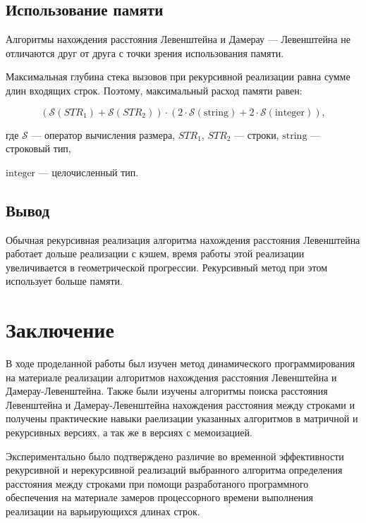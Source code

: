 \documentclass[12pt]{report}
\begin{document}
\section{Использование памяти}

Алгоритмы нахождения расстояния Левенштейна и Дамерау — Левенштейна не отличаются друг от друга с точки зрения использования памяти.

Максимальная глубина стека вызовов при рекурсивной реализации равна сумме длин входящих строк. Поэтому, максимальный расход памяти равен: 

\begin{equation}
(\mathcal{S}(STR_1) + \mathcal{S}(STR_2)) \cdot (2 \cdot \mathcal{S}\mathrm{(string)} + 2 \cdot \mathcal{S}\mathrm{(integer)}),
\end{equation}

\noindent где $\mathcal{S}$ — оператор вычисления размера, $STR_1$, $STR_2$ — строки, $\mathrm{string}$ — строковый тип, 

\noindent $\mathrm{integer}$ — целочисленный тип.


\section{Вывод}

Обычная рекурсивная реализация алгоритма нахождения расстояния Левенштейна работает дольше реализации с кэшем, время работы этой реализации увеличивается в геометрической прогрессии. Рекурсивный метод при этом использует больше памяти.


\chapter*{Заключение}

В ходе проделанной работы был изучен метод динамического программирования на материале реализации алгоритмов нахождения расстояния Левенштейна и Дамерау-Левенштейна. Также были изучены алгоритмы поиска расстояния Левенштейна и Дамерау-Левенштейна нахождения расстояния между строками и получены практические навыки раелизации указанных алгоритмов в матричной и рекурсивных версиях, а так же в версиях с мемоизацией.

Экспериментально было подтверждено различие во временной эффективности рекурсивной и нерекурсивной реализаций выбранного алгоритма определения расстояния между строками при помощи разработаного программного обеспечения на материале замеров процессорного времени выполнения реализации на варьирующихся длинах строк. 
\end{document}
